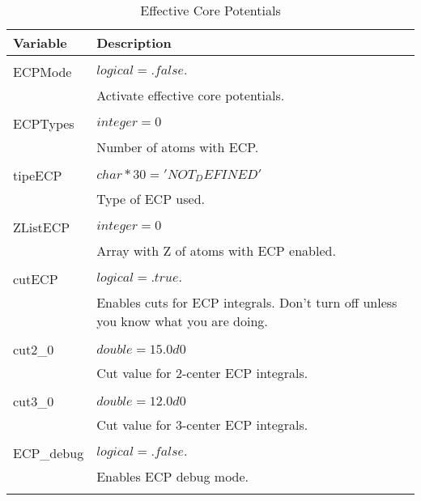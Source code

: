 \begin{Spacing}{1.0}
   \begin{longtable}{ p{} p{} }
   
      \toprule
      \textbf{Variable} & Description \\*
      \midrule \\*
      \endhead
   
      \bottomrule
      \caption{Effective Core Potentials}
      \endfoot
   
      ECPMode & $ logical = .false. $ \\
      & Activate effective core potentials.\\
      \\
   
      ECPTypes & $ integer = 0 $ \\
      & Number of atoms with ECP.\\
      \\
   
      tipeECP & $ char*30 = 'NOT_DEFINED' $ \\
      & Type of ECP used.\\
      \\
   
      ZListECP & $ integer = 0 $ \\
      & Array with Z of atoms with ECP enabled.\\
      \\
   
      cutECP & $ logical = .true. $ \\
      & Enables cuts for ECP integrals. Don't turn off unless you know what you are doing.\\
      \\
   
      cut2\_0 & $ double = 15.0d0 $ \\
      & Cut value for 2-center ECP integrals.\\
      \\
   
      cut3\_0 & $ double = 12.0d0 $ \\
      & Cut value for 3-center ECP integrals.\\
      \\
   
      ECP\_debug & $ logical = .false. $ \\
      & Enables ECP debug mode.\\
      \\
   

\end{longtable}
\end{Spacing}
